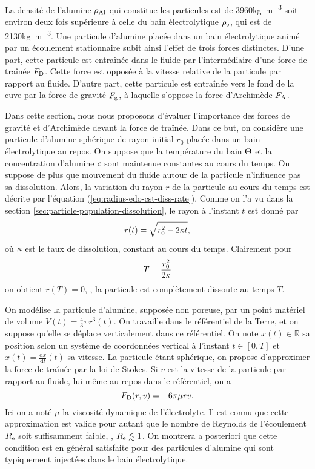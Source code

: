 La densité de l'alumine $\rho_\mathrm{Al}$ qui constitue les particules
est de \num{3960}\si{\kilo\gram\per\cubic\meter} soit environ deux
fois supérieure à celle du bain électrolytique $\rho_\mathrm{e}$,
qui est de \num{2130}\si{\kilo\gram\per\cubic\meter}. Une particule
d'alumine placée dans un bain électrolytique animé par un écoulement
stationnaire subit ainsi l'effet de trois forces
distinctes. D'une part, cette particule est entraînée dans le fluide
par l'intermédiaire d'une force de traînée $F_{\mathrm D}$. Cette force
est opposée à la vitesse relative de la particule par rapport au
fluide. D'autre part, cette particule est entraînée vers le fond de
la cuve par la force de gravité $F_{\mathrm g}$, à laquelle s'oppose
la force d'Archimède $F_{\mathrm A}$.

Dans cette section, nous nous proposons d'évaluer l'importance des
forces de gravité et d'Archimède devant la force de traînée. Dans ce
but, on considère une particule d'alumine sphérique de rayon initial
$r_0$ placée dans un bain électrolytique au repos. On suppose que la
température du bain $\Theta$ et la concentration d'alumine
$c$ sont maintenue constantes au cours du temps. On
suppose de plus que mouvement du fluide autour de la particule
n'influence pas sa dissolution. Alors, la variation du rayon $r$ de la
particule au cours du temps est décrite par l'équation
(\ref{eq:radius-edo-cst-diss-rate}). Comme on l'a vu dans la section
\ref{sec:particle-population-dissolution}, le rayon à l'instant $t$
est donné par
\begin{equation}\label{eq:radius}
  r(t) = \sqrt{r_0^2 - 2\kappa t},
\end{equation}
où $\kappa$ est le taux de dissolution, constant au cours du
temps. Clairement pour
\begin{equation}\label{eq:final-time}
  T = \frac{r_0^2}{2\kappa}
\end{equation}
on obtient $r(T) = 0$, \ie, la particule est complètement dissoute
au temps $T$.

On modélise la particule d'alumine, supposée non poreuse, par un point
matériel de volume $V(t) = \frac{4}{3}\pi r^3(t)$. On travaille dans
le référentiel de la Terre, et on suppose qu'elle se déplace
verticalement dans ce référentiel. On note $x(t)\in \mathbb R$ sa
position selon un système de coordonnées vertical à l'instant $t\in
[0,T]$ et $\dot x(t) = \frac{\mathrm dx}{\mathrm dt}(t)$ sa
vitesse. La particule étant sphérique, on propose d'approximer la
force de traînée par la loi de Stokes. Si $v$ est la vitesse de la
particule par rapport au fluide, lui-même au repos dans le
référentiel, on a
\begin{equation}
F_{\mathrm D}(r, v) = -6\pi\mu r v.
\end{equation}
Ici on a noté $\mu$ la viscosité dynamique de l'électrolyte. Il est
connu que cette approximation est valide pour autant que le nombre de
Reynolds de l'écoulement $R_{\mathrm e}$ soit suffisamment faible, \ie,
$R_{\mathrm e} \lesssim 1$. On montrera a posteriori que cette condition
est en général satisfaite pour des particules d'alumine qui sont
typiquement injectées dans le bain électrolytique.

